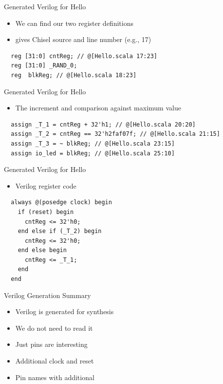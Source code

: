 \begin{frame}[fragile]{Generated Verilog for Hello}
\begin{itemize}
\item We can find our two register definitions
\item {} gives Chisel source and line number (e.g., 17)
\end{itemize}
\begin{verbatim}
  reg [31:0] cntReg; // @[Hello.scala 17:23]
  reg [31:0] _RAND_0;
  reg  blkReg; // @[Hello.scala 18:23]
\end{verbatim}
\end{frame}

\begin{frame}[fragile]{Generated Verilog for Hello}
\begin{itemize}
\item The increment and comparison against maximum value
\end{itemize}
\begin{verbatim}
  assign _T_1 = cntReg + 32'h1; // @[Hello.scala 20:20]
  assign _T_2 = cntReg == 32'h2faf07f; // @[Hello.scala 21:15]
  assign _T_3 = ~ blkReg; // @[Hello.scala 23:15]
  assign io_led = blkReg; // @[Hello.scala 25:10]
\end{verbatim}
\end{frame}

\begin{frame}[fragile]{Generated Verilog for Hello}
\begin{itemize}
\item Verilog register code
\end{itemize}
\begin{verbatim}
  always @(posedge clock) begin
    if (reset) begin
      cntReg <= 32'h0;
    end else if (_T_2) begin
      cntReg <= 32'h0;
    end else begin
      cntReg <= _T_1;
    end
  end
\end{verbatim}
\end{frame}

\begin{frame}[fragile]{Verilog Generation Summary}
\begin{itemize}
\item Verilog is generated for synthesis
\item We do not need to read it
\item Just pins are interesting
\item Additional clock and reset
\item Pin names with additional 
\end{itemize}
\end{frame}

